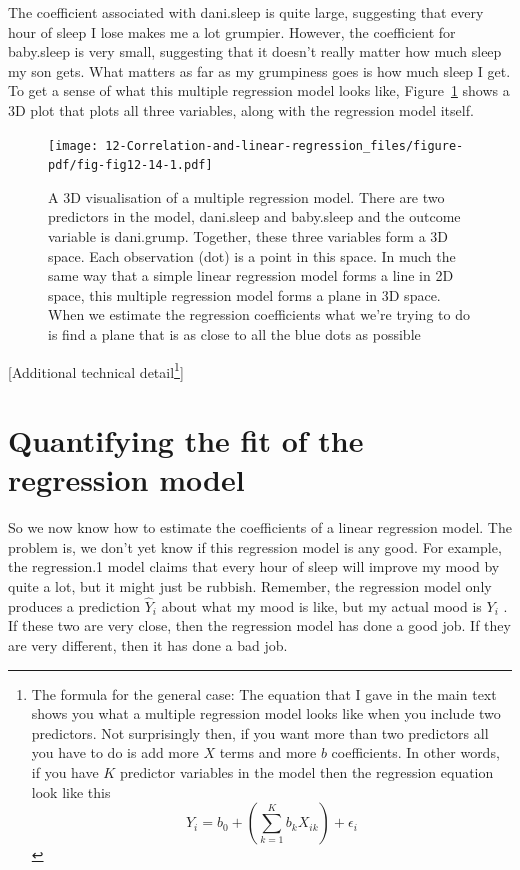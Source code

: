 \documentclass[
  a4paper,
]{book}
\begin{document}
The coefficient associated with dani.sleep is quite large, suggesting
that every hour of sleep I lose makes me a lot grumpier. However, the
coefficient for baby.sleep is very small, suggesting that it doesn't
really matter how much sleep my son gets. What matters as far as my
grumpiness goes is how much sleep I get. To get a sense of what this
multiple regression model looks like, Figure~\ref{fig-fig12-14} shows a
3D plot that plots all three variables, along with the regression model
itself.

\begin{figure}

\texttt{[image: 12-Correlation-and-linear-regression\_files/figure-pdf/fig-fig12-14-1.pdf]} \hfill{}

\caption{\label{fig-fig12-14}A 3D visualisation of a multiple regression
model. There are two predictors in the model, dani.sleep and baby.sleep
and the outcome variable is dani.grump. Together, these three variables
form a 3D space. Each observation (dot) is a point in this space. In
much the same way that a simple linear regression model forms a line in
2D space, this multiple regression model forms a plane in 3D space. When
we estimate the regression coefficients what we're trying to do is find
a plane that is as close to all the blue dots as possible}

\end{figure}

{[}Additional technical detail\footnote{The formula for the general
  case: The equation that I gave in the main text shows you what a
  multiple regression model looks like when you include two predictors.
  Not surprisingly then, if you want more than two predictors all you
  have to do is add more \(X\) terms and more \(b\) coefficients. In
  other words, if you have \(K\) predictor variables in the model then
  the regression equation look like this
  \[Y_i=b_0+(\sum_{k=1}^{K}b_k X_{ik})+\epsilon_i\]}{]}

\hypertarget{quantifying-the-fit-of-the-regression-model}{%
\section{Quantifying the fit of the regression
model}\label{quantifying-the-fit-of-the-regression-model}}

So we now know how to estimate the coefficients of a linear regression
model. The problem is, we don't yet know if this regression model is any
good. For example, the regression.1 model claims that every hour of
sleep will improve my mood by quite a lot, but it might just be rubbish.
Remember, the regression model only produces a prediction \(\hat{Y}_i\)
about what my mood is like, but my actual mood is \(Y_i\) . If these two
are very close, then the regression model has done a good job. If they
are very different, then it has done a bad job.
\end{document}
